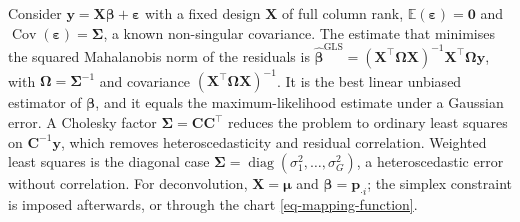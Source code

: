 \begin{theorem}
  \label{th:generalized-least-squares-estimate}
  Consider \(\boldsymbol{y}=\boldsymbol{X}\boldsymbol{\beta}+\boldsymbol{\varepsilon}\) with a fixed design \(\boldsymbol{X}\) of full column rank,
  \(\mathbb{E}(\boldsymbol{\varepsilon})=\boldsymbol{0}\) and \(\operatorname{Cov}(\boldsymbol{\varepsilon})=\boldsymbol{\Sigma}\), a known non-singular covariance.
  The estimate that minimises the squared Mahalanobis norm of the residuals is
  \(\hat{\boldsymbol{\beta}}^{\mathrm{GLS}}=(\boldsymbol{X}^{\top}\boldsymbol{\Omega}\boldsymbol{X})^{-1}\boldsymbol{X}^{\top}\boldsymbol{\Omega}\boldsymbol{y}\), with \(\boldsymbol{\Omega}=\boldsymbol{\Sigma}^{-1}\) and
  covariance \((\boldsymbol{X}^{\top}\boldsymbol{\Omega}\boldsymbol{X})^{-1}\).
  It is the best linear unbiased estimator of \(\boldsymbol{\beta}\), and it equals the maximum-likelihood estimate under a
  Gaussian error.
  A Cholesky factor \(\boldsymbol{\Sigma}=\boldsymbol{C}\boldsymbol{C}^{\top}\) reduces the problem to ordinary least squares on
  \(\boldsymbol{C}^{-1}\boldsymbol{y}\), which removes heteroscedasticity and residual correlation.
  Weighted least squares is the diagonal case \(\boldsymbol{\Sigma}=\operatorname{diag}(\sigma_{1}^{2},\ldots,\sigma_{G}^{2})\), a heteroscedastic
  error without correlation.
  For deconvolution, \(\boldsymbol{X}=\boldsymbol{\mu}\) and \(\boldsymbol{\beta}=\boldsymbol{p}_{\cdot i}\); the simplex constraint is imposed afterwards, or
  through the chart \eqref{eq-mapping-function}.
\end{theorem}

